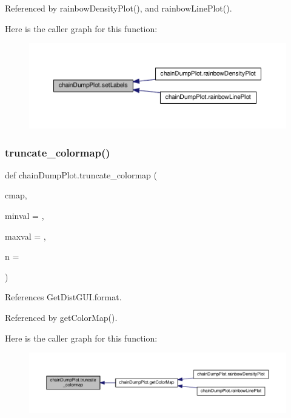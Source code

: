 Referenced by rainbow\+Density\+Plot(), and rainbow\+Line\+Plot().

Here is the caller graph for this function\+:
\nopagebreak
\begin{figure}[H]
\begin{center}
\leavevmode
\includegraphics[width=350pt]{namespacechainDumpPlot_ad7ceae1d45162491d4aded137ea0d167_icgraph}
\end{center}
\end{figure}
\mbox{\label{namespacechainDumpPlot_a13ab11787c4c59110336bce639925fdc}} 
\subsubsection{\texorpdfstring{truncate\+\_\+colormap()}{truncate\_colormap()}}
{\footnotesize\ttfamily def chain\+Dump\+Plot.\+truncate\+\_\+colormap (\begin{DoxyParamCaption}\item[{}]{cmap,  }\item[{}]{minval = {},  }\item[{}]{maxval = {},  }\item[{}]{n = {} }\end{DoxyParamCaption})}



References Get\+Dist\+G\+U\+I.\+format.



Referenced by get\+Color\+Map().

Here is the caller graph for this function\+:
\nopagebreak
\begin{figure}[H]
\begin{center}
\leavevmode
\includegraphics[width=350pt]{namespacechainDumpPlot_a13ab11787c4c59110336bce639925fdc_icgraph}
\end{center}
\end{figure}


